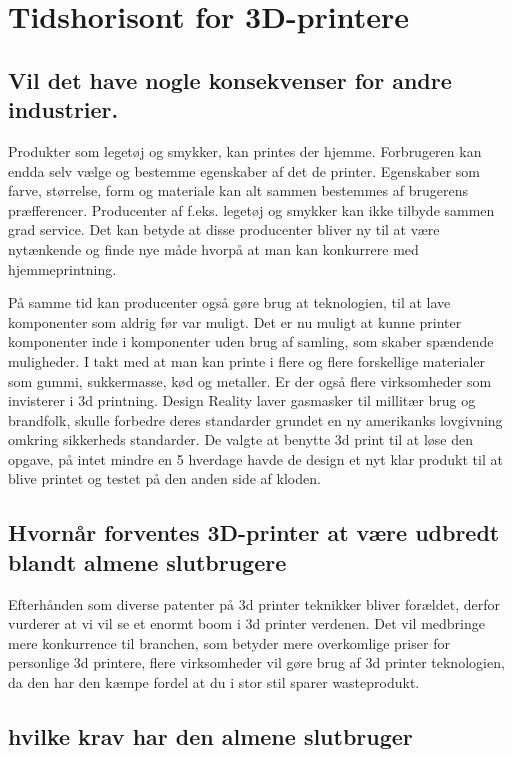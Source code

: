 
\chapter{Tidshorisont for 3D-printere}
\section{Vil det have nogle konsekvenser for andre industrier.}


Produkter som legetøj og smykker, kan printes der hjemme. Forbrugeren kan endda selv vælge og bestemme egenskaber af det de printer. Egenskaber som farve, størrelse, form og materiale kan alt sammen bestemmes af brugerens præfferencer. Producenter af f.eks. legetøj og smykker kan ikke tilbyde sammen grad service. Det kan betyde at disse producenter bliver ny til at være nytænkende og finde nye måde hvorpå at man kan konkurrere med hjemmeprintning.

På samme tid kan producenter også gøre brug at teknologien, til at lave komponenter som aldrig før var muligt. Det er nu muligt at kunne printer komponenter inde i komponenter uden brug af samling, som skaber spændende muligheder.
I takt med at man kan printe i flere og flere forskellige materialer som gummi, sukkermasse, kød og metaller. Er der også flere virksomheder som invisterer i 3d printning.
Design Reality laver gasmasker til millitær brug og brandfolk, skulle forbedre deres standarder grundet en ny amerikanks lovgivning omkring sikkerheds standarder. De valgte at benytte 3d print til at løse den opgave, på intet mindre en 5 hverdage havde de design et nyt klar produkt til at blive printet og testet på den anden side af kloden.\cite{gasmasker}

\section{Hvornår forventes 3D-printer at være udbredt blandt almene slutbrugere}

Efterhånden som diverse patenter på 3d printer teknikker bliver forældet, derfor vurderer \cite{manyika_disruptive_2013} at vi vil se et enormt boom i 3d printer verdenen. Det vil medbringe mere konkurrence til branchen, som betyder mere overkomlige priser for personlige 3d printere, flere virksomheder vil gøre brug af 3d printer teknologien, da den har den kæmpe fordel at du i stor stil sparer wasteprodukt. 

\section{hvilke krav har den almene slutbruger}

